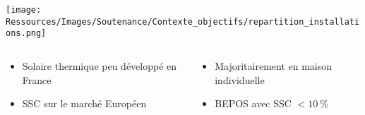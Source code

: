 \documentclass[xcolor=x11names, compress, 11pt]{beamer}
\begin{document}
\begin{frame}[c]
    \vfill
    \centering
    \texttt{[image: Ressources/Images/Soutenance/Contexte\_objectifs/repartition\_installations.png]}
    \begin{columns}
        \begin{column}{0.45\textwidth}
            \begin{center}
                \begin{itemize}
                    \item Solaire thermique peu développé en France
                    \item SSC sur le marché Européen
                \end{itemize}
            \end{center}
        \end{column}%
        \begin{column}{0.45\textwidth}
            \begin{center}
                \begin{itemize}
                    \item Majoritairement en maison individuelle
                    \item BEPOS avec SSC $< \SI{10}{\percent}$
                \end{itemize}
            \end{center}
        \end{column}%
    \end{columns}%
    \vfill
\end{frame}



\end{document}
